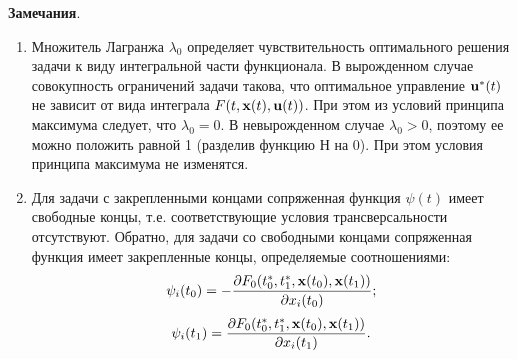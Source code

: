 \documentclass[a4paper, 12pt]{article}
\begin{document}
{\bf Замечания}.
\begin{enumerate}
    \item Множитель Лагранжа  $\lambda_0$ определяет чувствительность оптимального
решения задачи к виду интегральной части функционала. В вырожденном
случае совокупность ограничений задачи такова, что оптимальное
управление ${\bf u}^*(t)$ не зависит от вида интеграла $F(t, {\bf x}(t), {\bf u}(t))$. При этом из условий принципа максимума следует, что  
$\lambda_0 = 0$. В невырожденном случае $\lambda_0 > 0$, поэтому ее можно положить равной 1 (разделив функцию Н на 0). При этом условия принципа максимума не изменятся.
  \item Для задачи с закрепленными концами сопряженная функция  $\psi (t)$
имеет свободные концы, т.е. соответствующие условия трансверсальности
отсутствуют.
Обратно, для задачи со свободными концами сопряженная функция имеет закрепленные концы, определяемые соотношениями:
$$\psi_i (t_0)=-\dfrac{\partial F_0 (t_0^*,t_1^*,{\bf x}(t_0),{\bf x}(t_1))}{\partial x_i (t_0)} ;$$
$$\psi_i (t_1)=\dfrac{\partial F_0 (t_0^*,t_1^*,{\bf x}(t_0),{\bf x}(t_1))}{\partial x_i (t_1)} .$$
\end{enumerate}
\end{document}
